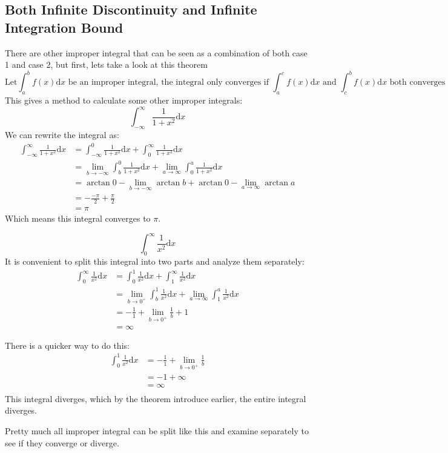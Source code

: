 \documentclass{article}
\begin{document}
\subsection{Both Infinite Discontinuity and Infinite Integration Bound}
There are other improper integral that can be seen as a combination of both case 1 and case 2,
but first, lets take a look at this theorem
\[
    \text{Let} \int_{a}^{b} f(x)\mathrm{d}x \text{ be an improper integral, } 
    \text{the integral only converges if } \int_{a}^{c} f(x)\mathrm{d}x \text{ and } \int_{c}^{b} f(x)\mathrm{d}x \text{ both converges}
\]
This gives a method to calculate some other improper integrals:
\[
    \int_{-\infty}^{\infty} \frac{1}{1+x^2}\mathrm{d}x
\]
We can rewrite the integral as:
\[
    \begin{split}
        \int_{-\infty}^{\infty} \frac{1}{1+x^2}\mathrm{d}x & = \int_{-\infty}^{0} \frac{1}{1+x^2}\mathrm{d}x + \int_{0}^{\infty} \frac{1}{1+x^2} \mathrm{d}x \\
        & = \lim_{b\to -\infty} \int_{b}^{0} \frac{1}{1+x^2}\mathrm{d}x + \lim_{a\to \infty} \int_{0}^{a}\frac{1}{1+x^2}\mathrm{d}x\\
        & = \arctan 0 - \lim_{b\to -\infty} \arctan b + \arctan 0 - \lim_{a\to \infty} \arctan a \\
        & = -\frac{-\pi}{2} + \frac{\pi}{2} \\
        & = \pi
    \end{split}
\]
Which means this integral converges to $\pi$.

\[
    \int_{0}^{\infty} \frac{1}{x^2}\mathrm{d}x
\]
It is convenient to split this integral into two parts and analyze them separately:
\[
    \begin{split}
        \int_{0}^{\infty} \frac{1}{x^2}\mathrm{d}x &= \int_{0}^{1}\frac{1}{x^2}\mathrm{d}x + \int_{1}^{\infty}\frac{1}{x^2} \mathrm{d}x\\
        & = \lim_{b\to 0^+} \int_{b}^{1} \frac{1}{x^2}\mathrm{d}x + \lim_{a\to \infty} \int_{1}^{a} \frac{1}{x^2} \mathrm{d}x \\
        & = -\frac{1}{1} + \lim_{b\to 0^+} \frac{1}{b} + 1\\
        & = \infty
    \end{split}
\]

There is a quicker way to do this:
\[
    \begin{split}
        \int_{0}^{1}\frac{1}{x^2}\mathrm{d}x & = -\frac{1}{1} + \lim_{b\to 0^+} \frac{1}{b} \\
        & = -1 + \infty \\
        & = \infty \\
    \end{split}
\]
This integral diverges, which by the theorem introduce earlier, the entire integral diverges.

Pretty much all improper integral can be split like this and examine separately to see if they converge or diverge.
\end{document}
